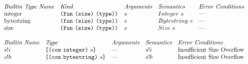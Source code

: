 \documentclass[../main.tex]{subfiles}
\begin{document}
    
    
\begin{figure*}[t]
    \footnotesize
    \centering
    
    \[\begin{array}{lllll}
        \textit{Builtin Type Name} & \textit{Kind} & \textit{Arguments} & \textit{Semantics} & \textit{Error Conditions}\\
        
        \mathrm{integer} & \texttt{(} \texttt{fun} ~ \texttt{(} \texttt{size} \texttt{)}{} ~ \texttt{(} \texttt{type} \texttt{)}{} \texttt{)} & s & Integer ~ s & \textrm{---}\\
        
        \mathrm{bytestring} & \texttt{(} \texttt{fun} ~ \texttt{(} \texttt{size} \texttt{)}{} ~ \texttt{(} \texttt{type} \texttt{)}{} \texttt{)} & s & Bytestring ~ s & \textrm{---}\\
        
        \mathrm{size} & \texttt{(} \texttt{fun} ~ \texttt{(} \texttt{size} \texttt{)}{} ~ \texttt{(} \texttt{type} \texttt{)}{} \texttt{)} & s & Size ~ s & \textrm{---}\\
    \end{array}\]
    
    \[\begin{array}{lllll}
        \textit{Builtin Name} & \textit{Type} & \textit{Arguments} & \textit{Semantics} & \textit{Error Conditions}\\
        
        s!i   & \texttt{[} \texttt{(} \texttt{con} ~ \texttt{integer} \texttt{)} ~ s \texttt{]}      &   \textrm{---}   &    s!i    &   \textrm{Insufficient Size Overflow}\\
        
        s!b   & \texttt{[} \texttt{(} \texttt{con} ~ \texttt{bytestring} \texttt{)} ~ s \texttt{]}   &   \textrm{---}   &    s!b    &   \textrm{Insufficient Size Overflow}\\
        

\end{array}\]
\end{figure*}
\end{document}
